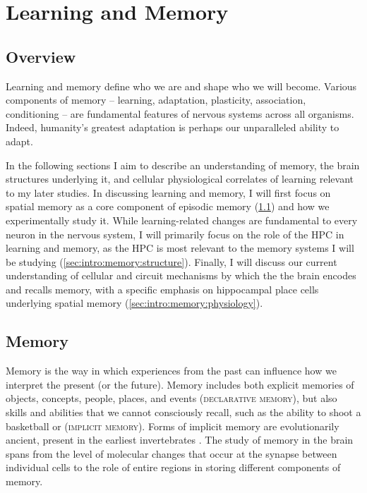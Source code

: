 \acresetall
\chapter{Learning and Memory}
\label{ch:intro:memory}
\section*{Overview}
Learning and memory define who we are and shape who we will become.
Various components of memory -- learning, adaptation, plasticity, association, conditioning -- are fundamental features of nervous systems across all organisms.
Indeed, humanity's greatest adaptation is perhaps our unparalleled ability to adapt.

In the following sections I aim to describe an understanding of memory, the brain structures underlying it, and cellular physiological correlates of learning relevant to my later studies.
In discussing learning and memory, I will first focus on spatial memory as a core component of episodic memory (\ref{sec:intro:memory:memory}) and how we experimentally study it.
While learning-related changes are fundamental to every neuron in the nervous system, I will primarily focus on the role of the \ac{HPC} in learning and memory, as the \ac{HPC} is most relevant to the memory systems I will be studying (\ref{sec:intro:memory:structure}).
Finally, I will discuss our current understanding of cellular and circuit mechanisms by which the the brain encodes and recalls memory, with a specific emphasis on hippocampal place cells underlying spatial memory (\ref{sec:intro:memory:physiology}).

\section{Memory}\label{sec:intro:memory:memory}
Memory is the way in which experiences from the past can influence how we interpret the present (or the future).
Memory includes both explicit memories of objects, concepts, people, places, and events (\textsc{declarative memory}), but also skills and abilities that we cannot consciously recall, such as the ability to shoot a basketball or  (\textsc{implicit memory}).
Forms of implicit memory are evolutionarily ancient, present in the earliest invertebrates \citep{Milner1998}.
The study of memory in the brain spans from the level of molecular changes that occur at the synapse between individual cells to the role of entire regions in storing different components of memory.

